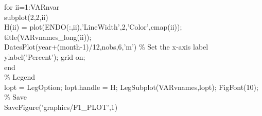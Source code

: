 \hspace{1mm}\hspace{5mm} \textcolor{matlabblue}{for} ii=1:VARnvar \\ 
\hspace{1mm}\hspace{5mm} \hspace{5mm} subplot(2,2,ii) \\ 
\hspace{1mm}\hspace{5mm} \hspace{5mm} H(ii) = plot(ENDO(:,ii),\textcolor{matlabpurple}{'LineWidth'},2,\textcolor{matlabpurple}{'Color'},cmap(ii)); \\ 
\hspace{1mm}\hspace{5mm} \hspace{5mm} title(VARvnames\_long(ii));  \\ 
\hspace{1mm}\hspace{5mm} \hspace{5mm} DatesPlot(year+(month-1)/12,nobs,6,\textcolor{matlabpurple}{'m'}) \textcolor{matlabgreen}{\% Set the x-axis label  }\\ 
\hspace{1mm}\hspace{5mm} \hspace{5mm} ylabel(\textcolor{matlabpurple}{'Percent'}); grid on;  \\ 
\hspace{1mm}\hspace{5mm} \textcolor{matlabblue}{end} \\ 
\hspace{1mm}\hspace{5mm} \textcolor{matlabgreen}{\% Legend }\\ 
\hspace{1mm}\hspace{5mm} lopt = LegOption; lopt.handle = H; LegSubplot(VARvnames,lopt); FigFont(10); \\ 
\hspace{1mm}\hspace{5mm} \textcolor{matlabgreen}{\% Save  }\\ 
\hspace{1mm}\hspace{5mm} SaveFigure(\textcolor{matlabpurple}{'graphics/F1\_PLOT'},1) \\ 
\hspace{1mm}\hspace{5mm}  \\ 
